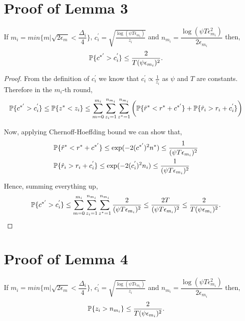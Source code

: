 \section{Proof of Lemma 3}
\label{App:Lemma3}
\begin{lemma}
\label{proofTheorem:Lemma:3}
If $m_i = min\lbrace m|\sqrt{2\epsilon_{m} } < \dfrac{\Delta_i}{4} \rbrace $, $c_{i}^{'} =\sqrt{\frac{\log (\psi T\epsilon_{m_{i}})}{z_{i}}}$ and $n_{m_i}=\dfrac{\log{(\psi T\epsilon_{m_{i}}^{2})}}{2\epsilon_{m_{i}}}$ then, 
\begin{align*}
\mathbb{P}\lbrace c^{*'} > c_i^{'} \rbrace \leq \dfrac{2}{T(\psi \epsilon_{m_i})^2}.
\end{align*}
\end{lemma}

\begin{proof}
From the definition of $c_i^{'}$ we know that $c_i^{'}\propto \frac{1}{z_i}$ as $\psi$ and $T$ are constants. Therefore in the $m_i$-th round,
\begin{align*}
\mathbb{P}\lbrace c^{*'} > c_i^{'} \rbrace \leq  \mathbb{P}\lbrace  z^* < z_i  \rbrace \leq \sum_{m=0}^{m_i}\sum_{z_i =1}^{n_{m_i}}\sum_{z^* =1}^{n_{m_i}}\bigg(\mathbb{P}\lbrace \hat{r}^* < r^* + c^{*'}\rbrace + \mathbb{P}\lbrace \hat{r}_i > r_i + c_i^{'}\rbrace\bigg)
\end{align*}

Now, applying Chernoff-Hoeffding bound we can show that,
\begin{align*}
&\mathbb{P}\lbrace \hat{r}^* < r^* + c^{*'}\rbrace \leq \exp(- 2(c^{*'})^2 n^*)\leq \frac{1}{(\psi T\epsilon_{m_i})^2} \\ 
&\mathbb{P}\lbrace \hat{r}_i > r_i + c_i^{'}\rbrace \leq \exp(- 2(c_i^{'})^2 n_i)\leq \frac{1}{(\psi T\epsilon_{m_i})^2}
\end{align*}

Hence, summing everything up, 
\begin{align*}
\mathbb{P}\lbrace c^{*'} > c_i^{'} \rbrace \leq \sum_{m=0}^{m_i}\sum_{z_i =1}^{n_{m_i}}\sum_{z^* =1}^{n_{m_i}} \dfrac{2}{(\psi T\epsilon_{m_i})^2} \leq \dfrac{2T}{(\psi T\epsilon_{m_i})^2} \leq \dfrac{2}{T(\psi\epsilon_{m_i})^2}.
\end{align*}

\end{proof}


\section{Proof of Lemma 4}
\label{App:Lemma4}
\begin{lemma}
\label{proofTheorem:Lemma:4}
If $m_i = min\lbrace m|\sqrt{2\epsilon_{m} } < \dfrac{\Delta_i}{4} \rbrace $, $c_{i}^{'} =\sqrt{\frac{\log (\psi T\epsilon_{m_{i}})}{ z_{i}}}$ and $n_{m_i}=\dfrac{\log{(\psi T\epsilon_{m_{i}}^{2})}}{2\epsilon_{m_{i}}}$ then, 
\begin{align*}
\mathbb{P}\lbrace z_i > n_{m_i} \rbrace \leq \dfrac{2}{T(\psi \epsilon_{m_i})^2}.
\end{align*}
\end{lemma}

